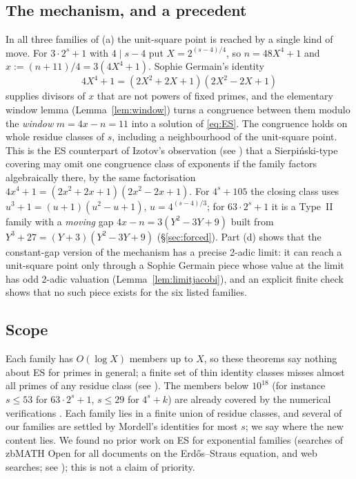 \documentclass[11pt,reqno]{amsart}
\theoremstyle{definition}
\begin{document}
\subsection*{The mechanism, and a precedent}
In all three families of (a) the unit-square point is reached by a single
kind of move.  For $3\cdot2^s+1$ with $4\mid s-4$ put $X=2^{(s-4)/4}$, so
$n=48X^4+1$ and $x:=(n+11)/4=3(4X^4+1)$.  Sophie Germain's identity
\[
  4X^4+1=(2X^2+2X+1)(2X^2-2X+1)
\]
supplies divisors of $x$ that are not powers of fixed primes, and the
elementary window lemma (Lemma~\ref{lem:window}) turns a congruence
between them modulo the \emph{window} $m=4x-n=11$ into a solution of
\eqref{eq:ES}.  The congruence holds on whole residue classes of $s$,
including a neighbourhood of the unit-square point.  This is the ES
counterpart of Izotov's observation \cite{Izotov} (see \cite[pp.~3--4]{FFK})
that a Sierpi\'nski-type covering may omit one congruence class of
exponents if the family factors algebraically there, by the same
factorisation $4x^4+1=(2x^2+2x+1)(2x^2-2x+1)$.  For $4^s+105$ the closing
class uses $u^3+1=(u+1)(u^2-u+1)$, $u=4^{(s-4)/3}$; for $63\cdot2^s+1$ it is
a Type~II family with a \emph{moving} gap $4x-n=3(Y^2-3Y+9)$ built from
$Y^3+27=(Y+3)(Y^2-3Y+9)$ (\S\ref{sec:forced}).  Part (d) shows that the
constant-gap version of the mechanism has a precise 2-adic limit: it can
reach a unit-square point only through a Sophie Germain piece whose value
at the limit has odd 2-adic valuation (Lemma~\ref{lem:limitjacobi}), and an
explicit finite check shows that no such piece exists for the six listed
families.

\subsection*{Scope}
Each family has $O(\log X)$ members up to $X$, so these theorems say
nothing about ES for primes in general; a finite set of thin identity
classes misses almost all primes of any residue class (see
\cite[Prop.~5.1]{MenuSterility}).  The members below $10^{18}$ (for instance $s\le53$ for
$63\cdot2^s+1$, $s\le29$ for $4^s+k$) are already covered by the numerical
verifications \cite{Salez,MD}.  Each family lies
in a finite union of residue classes, and several of our families are
settled by Mordell's identities for most $s$; we say where the new content
lies.  We found no prior work on ES for exponential families (searches of
zbMATH Open for all documents on the Erd\H{o}s--Straus equation, and web
searches; see \cite{Audit}); this is not a claim of priority.
\end{document}
